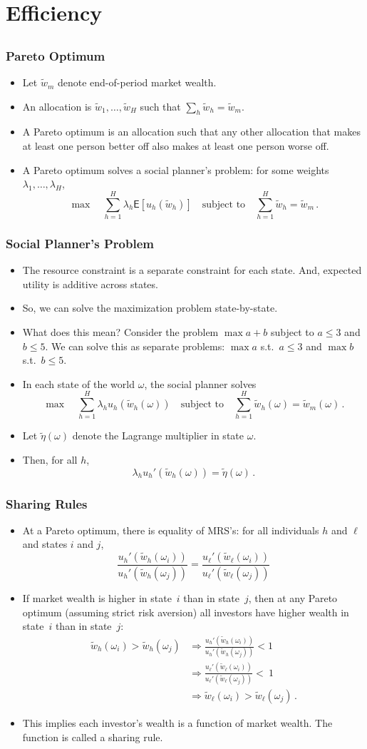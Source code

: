 \documentclass[10pt]{beamer}
\newcommand{\bi}{\begin{itemize}}
\newcommand{\ei}{\end{itemize}}
\newcommand{\im}{\item}
\newcommand{\mye}{\ensuremath{\mathsf{E}}}
\newcommand{\bfr}{\begin{frame}}
\newcommand{\tw}{\tilde{w}}
\begin{document}
  \section{Efficiency}\subsection{}
  
  \bfr\frametitle{Pareto Optimum}
  \bi 
   \im Let $\tw_m$ denote end-of-period market wealth.
   \im   An allocation is $\tw_1, \ldots, \tw_H$ such that $\sum_h \tw_h = \tw_m$.
  \im   A Pareto optimum is an allocation such that any other allocation that makes at least one person better off also makes at least one person worse off.
  \im 
  A Pareto optimum solves a social planner's problem: for some weights $\lambda_1, \ldots, \lambda_H$, 
  $$\max \quad \sum_{h=1}^H \lambda_h\mye [u_h(\tw_h)] \quad \text{subject to} \quad \sum_{h=1}^H \tw_h = \tw_m\,.$$
  \ei 
  \end{frame}
  
  \bfr\frametitle{Social Planner's Problem}
  \bi 
  \im The resource constraint is a separate constraint for each state.  And, expected utility is additive across states.
  \im So, we can solve the maximization problem state-by-state.  
  \im   What does this mean?  Consider the problem $\max a + b$ subject to $a\le 3$ and $b\le 5$.  We can solve this as separate problems: $\max a$ s.t.\ $a \le 3$ and $\max b$ s.t.\ $b\le 5$.
  \im 
  In each state of the world $\omega$, the social planner solves
  $$\max \quad \sum_{h=1}^H \lambda_hu_h(\tw_h(\omega)) \quad \text{subject to} \quad \sum_{h=1}^H \tw_h(\omega) = \tw_m(\omega)\,.$$
  \im 
  Let $\tilde{\eta}(\omega)$ denote the Lagrange multiplier in state $\omega$.  
  \im Then, for all $h$,
  $$\lambda_h u_h'(\tw_h(\omega)) = \tilde{\eta}(\omega)\,.$$
  \ei
  \end{frame}
  
  \bfr\frametitle{Sharing Rules}
  \bi 
  \im At a Pareto optimum, there is equality of MRS's: for all individuals $h$ and $\ell$ and states $i$ and $j$,
  $$\frac{u_h'(\tw_h(\omega_i))}{u_h'(\tw_h(\omega_j))} = \frac{u_\ell'(\tw_\ell(\omega_i))}{u_\ell'(\tw_\ell(\omega_j))}$$
   \im If market wealth is higher in state~$i$ than in state~$j$, then at any Pareto optimum (assuming strict risk aversion) all investors have higher wealth in state~$i$ than in state~$j$: 
  \begin{align*}
  \widetilde{w}_h(\omega_i)>\widetilde{w}_h(\omega_j) & \Rightarrow \frac{u_h'(\widetilde{w}_h(\omega_i))}{u_h'(\widetilde{w}_h(\omega_j))} < 1 \\
  & \Rightarrow \frac{u_\ell'(\widetilde{w}_\ell(\omega_i))}{u_\ell'(\widetilde{w}_\ell(\omega_j))} <~1 \\
  &\Rightarrow \widetilde{w}_\ell(\omega_i)>\widetilde{w}_\ell(\omega_j)\,.
  \end{align*}
   \im This implies each investor's wealth is a function of market wealth.  The function is called a sharing rule.
  \ei 
  \end{frame}
  
\end{document}
